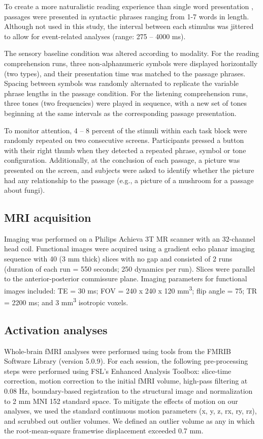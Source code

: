 To create a more naturalistic reading experience than single word presentation \cite{Rayner1986}, passages were presented in syntactic phrases ranging from 1-7 words in length. Although not used in this study, the interval between each stimulus was jittered to allow for event-related analyses (range: 275 – 4000 ms). 

The sensory baseline condition was altered according to modality. For the reading comprehension runs, three non-alphanumeric symbols were displayed horizontally (two types), and their presentation time was matched to the passage phrases. Spacing between symbols was randomly alternated to replicate the variable phrase lengths in the passage condition. For the listening comprehension runs, three tones (two frequencies) were played in sequence, with a new set of tones beginning at the same intervals as the corresponding passage presentation. 

To monitor attention, 4 – 8 percent of the stimuli within each task block were randomly repeated on two consecutive screens.  Participants pressed a button with their right thumb when they detected a repeated phrase, symbol or tone configuration. Additionally, at the conclusion of each passage, a picture was presented on the screen, and subjects were asked to identify whether the picture had any relationship to the passage (e.g., a picture of a mushroom for a passage about fungi). 

\subsection{MRI acquisition}

Imaging was performed on a Philips Achieva 3T MR scanner with an 32-channel head coil. Functional images were acquired using a gradient echo planar imaging sequence with 40 (3 mm thick) slices with no gap and consisted of 2 runs (duration of each run = 550 seconds; 250 dynamics per run). Slices were parallel to the anterior-posterior commissure plane. Imaging parameters for functional images included: TE = 30 ms; FOV = 240 x 240 x 120 mm\textsuperscript{3}; flip angle = 75\degree; TR = 2200 ms; and 3 mm\textsuperscript{3} isotropic voxels.

\subsection{Activation analyses}

Whole-brain fMRI analyses were performed using tools from the FMRIB Software Library (version 5.0.9). For each session, the following pre-processing steps were performed using FSL’s Enhanced Analysis Toolbox:  slice-time correction, motion correction to the initial fMRI volume, high-pass filtering at 0.08 Hz, boundary-based registration to the structural image and normalization to 2 mm MNI 152 standard space. To mitigate the effects of motion on our analyses, we used the standard continuous motion parameters (x, y, z, rx, ry, rz), and scrubbed out outlier volumes. We defined an outlier volume as any in which the root-mean-square framewise displacement exceeded 0.7 mm. 

